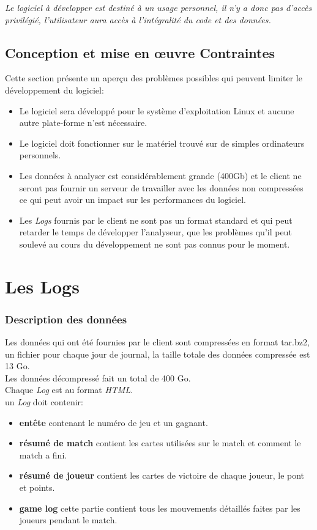 \documentclass{scrreprt}
\begin{document}
\textit{Le logiciel à développer est destiné à un usage personnel, il n'y a donc pas d'accès privilégié, l'utilisateur aura accès à l'intégralité du code et des données.}
\section{Conception et mise en œuvre Contraintes}
Cette section présente un aperçu des problèmes possibles qui peuvent limiter le développement du logiciel:
\begin{itemize}
\item Le logiciel sera développé pour le système d'exploitation Linux et aucune autre plate-forme n’est nécessaire.
\item Le logiciel doit fonctionner sur le matériel trouvé sur de simples ordinateurs personnels.
\item Les données à analyser est considérablement grande (400Gb) et le client ne seront pas fournir un serveur de travailler avec les données non compressées ce qui peut avoir un impact sur les performances du logiciel.

\item Les \textit{Logs} fournis par le client ne sont pas un format standard et qui peut retarder le temps de développer l'analyseur, que les problèmes qu'il peut soulevé au cours du développement ne sont pas connus pour le moment.
\end{itemize}

\chapter{Les Logs}
\subsection{Description des données}
Les données qui ont été fournies par le client sont compressées en format tar.bz2, un fichier pour chaque jour de journal, la taille totale des données compressée est 13 Go.\\
Les données décompressé fait un total de 400 Go.\\
Chaque \textit{Log} est au format \textit{HTML}.\\
un \textit{Log} doit contenir:
\begin{itemize}
  \item{\textbf{entête}} contenant le numéro de jeu et un gagnant.
  \item{\textbf{résumé de  match}} contient les cartes utilisées sur le match et comment le match a fini.
  \item{\textbf{résumé de joueur}} contient  les cartes de victoire de chaque joueur, le pont et points.
  \item{\textbf{game log}} cette partie contient tous les mouvements détaillés faites par les joueurs pendant le match.

\end{itemize}
\end{document}
